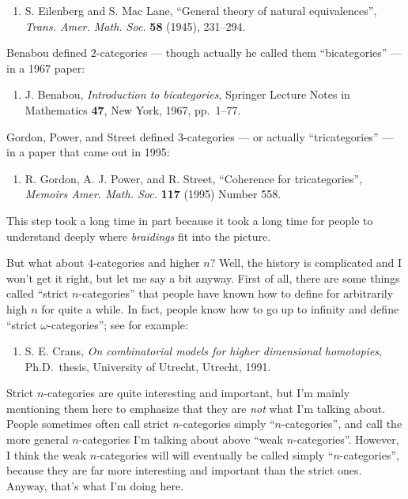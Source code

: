 \documentclass{article}
\def\tightlist{}
\begin{document}
\begin{enumerate}
\def\labelenumi{\arabic{enumi})}
\tightlist
\item
  S. Eilenberg and S. Mac Lane, ``General theory of natural
  equivalences'', \emph{Trans. Amer. Math. Soc.} \textbf{58} (1945),
  231--294.
\end{enumerate}

Benabou defined \(2\)-categories --- though actually he called them
``bicategories'' --- in a 1967 paper:

\begin{enumerate}
\def\labelenumi{\arabic{enumi})}
\setcounter{enumi}{1}
\tightlist
\item
  J. Benabou, \emph{Introduction to bicategories}, Springer Lecture
  Notes in Mathematics \textbf{47}, New York, 1967, pp.~1--77.
\end{enumerate}

Gordon, Power, and Street defined \(3\)-categories --- or actually
``tricategories'' --- in a paper that came out in 1995:

\begin{enumerate}
\def\labelenumi{\arabic{enumi})}
\setcounter{enumi}{2}
\tightlist
\item
  R. Gordon, A. J. Power, and R. Street, ``Coherence for
  tricategories'', \emph{Memoirs Amer. Math. Soc.} \textbf{117} (1995)
  Number 558.
\end{enumerate}

This step took a long time in part because it took a long time for
people to understand deeply where \emph{braidings} fit into the picture.

But what about \(4\)-categories and higher \(n\)? Well, the history is
complicated and I won't get it right, but let me say a bit anyway. First
of all, there are some things called ``strict \(n\)-categories'' that
people have known how to define for arbitrarily high \(n\) for quite a
while. In fact, people know how to go up to infinity and define ``strict
\(\omega\)-categories''; see for example:

\begin{enumerate}
\def\labelenumi{\arabic{enumi})}
\setcounter{enumi}{3}
\tightlist
\item
  S. E. Crans, \emph{On combinatorial models for higher dimensional
  homotopies}, Ph.D.~thesis, University of Utrecht, Utrecht, 1991.
\end{enumerate}

Strict \(n\)-categories are quite interesting and important, but I'm
mainly mentioning them here to emphasize that they are \emph{not} what
I'm talking about. People sometimes often call strict \(n\)-categories
simply ``\(n\)-categories'', and call the more general \(n\)-categories
I'm talking about above ``weak \(n\)-categories''. However, I think the
weak \(n\)-categories will will eventually be called simply
``\(n\)-categories'', because they are far more interesting and
important than the strict ones. Anyway, that's what I'm doing here.
\end{document}
